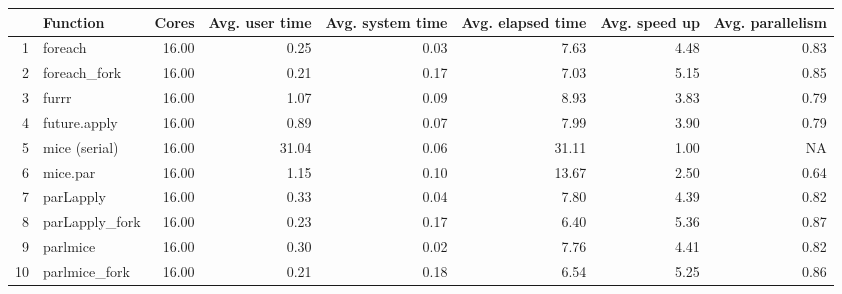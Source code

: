 \begin{table}[ht]
\centering
\begin{tabular}{rlrrrrrr}
  \hline
 & Function & Cores & Avg. user time & Avg. system time & Avg. elapsed time & Avg. speed up & Avg. parallelism \\ 
  \hline
1 & foreach & 16.00 & 0.25 & 0.03 & 7.63 & 4.48 & 0.83 \\ 
  2 & foreach\_fork & 16.00 & 0.21 & 0.17 & 7.03 & 5.15 & 0.85 \\ 
  3 & furrr & 16.00 & 1.07 & 0.09 & 8.93 & 3.83 & 0.79 \\ 
  4 & future.apply & 16.00 & 0.89 & 0.07 & 7.99 & 3.90 & 0.79 \\ 
  5 & mice (serial) & 16.00 & 31.04 & 0.06 & 31.11 & 1.00 &  NA \\ 
  6 & mice.par & 16.00 & 1.15 & 0.10 & 13.67 & 2.50 & 0.64 \\ 
  7 & parLapply & 16.00 & 0.33 & 0.04 & 7.80 & 4.39 & 0.82 \\ 
  8 & parLapply\_fork & 16.00 & 0.23 & 0.17 & 6.40 & 5.36 & 0.87 \\ 
  9 & parlmice & 16.00 & 0.30 & 0.02 & 7.76 & 4.41 & 0.82 \\ 
  10 & parlmice\_fork & 16.00 & 0.21 & 0.18 & 6.54 & 5.25 & 0.86 \\ 
   \hline
\end{tabular}
\end{table}
